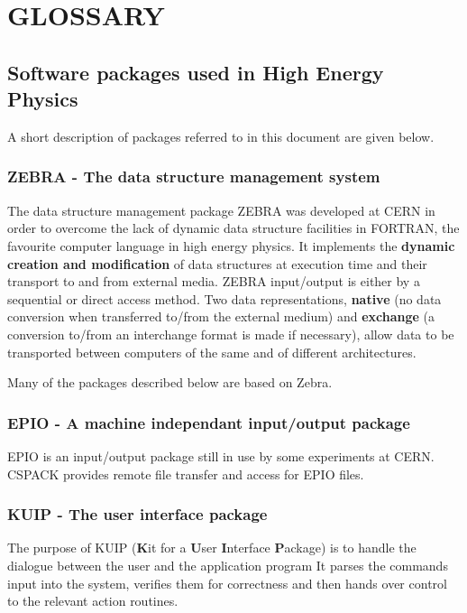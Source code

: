 \chapter{GLOSSARY}
\par
{}
\section{Software packages used in High Energy Physics}
\par
A short description of packages referred to in this document
are given below.
\subsection{ZEBRA - The data structure management system}
\par
{}
The data structure management package ZEBRA
was developed at CERN in order to overcome the lack of dynamic
data structure facilities in FORTRAN, the favourite computer language
in high energy physics. It implements the {\bf dynamic
creation and modification} of data structures at execution time
and their transport
to and from external media.
ZEBRA input/output is either by a sequential or direct access method.
Two data representations,
{\bf native} (no data conversion when transferred to/from the
external medium) and {\bf exchange} (a conversion to/from an
interchange format is made if necessary), allow data to be transported between
computers of the same and of different architectures.
\par
Many of the packages described below are based on Zebra.
\subsection{EPIO - A machine independant input/output package}
\par
{}
EPIO is an input/output package still in use by some experiments at
CERN. CSPACK provides remote file transfer and access for EPIO files.
\subsection{KUIP - The user interface package}
\par
The purpose of KUIP
({\bf K}it for a {\bf U}ser
{\bf I}nterface {\bf P}ackage) is to handle
the dialogue between the user and the application program
It parses the commands input into the system, verifies them for
correctness and then hands over control to the relevant action
routines.
